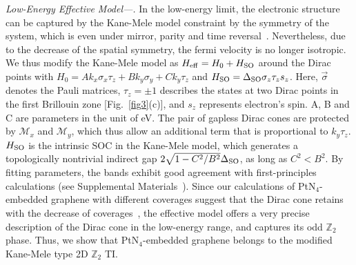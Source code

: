 \documentclass[aps,prl,twocolumn,showpacs,superscriptaddress]{revtex4-1}
\begin{document}
\textit{Low-Energy Effective Model---.} In the low-energy limit, the electronic structure can be captured by the Kane-Mele model constraint by the symmetry of the system, which is even under mirror, parity and time reversal~\cite{ref3,ref4,ref55,ref56}. Nevertheless, due to the decrease of the spatial symmetry, the fermi velocity is no longer isotropic. We thus modify the Kane-Mele
model as $H_{\rm eff}=H_0+H_{\rm SO}$ around the Dirac points with $H_0=Ak_x\sigma_x\tau_z+Bk_y\sigma_y+Ck_y\tau_z$ and $H_{\rm SO}=\Delta_{\rm SO}\sigma_z\tau_zs_z$. Here, $\vec\sigma$ denotes the Pauli matrices, $\tau_z=\pm1$ describes the states at two Dirac points in the first Brillouin zone [Fig.~\ref{fig3}(c)], and $s_z$ represents electron's spin. A, B and C are parameters in the unit of eV. The pair of gapless Dirac cones are protected by $\mathcal{M}_x$ and $\mathcal{M}_y$, which thus allow an additional term that is proportional to $k_y\tau_z$. $H_{\rm SO}$ is the intrinsic SOC in the Kane-Mele model, which generates a topologically nontrivial indirect gap $2\sqrt{1-C^2/B^2} \Delta_{\rm SO}$, as long as $C^2<B^2$. By fitting parameters, the bands exhibit good agreement with first-principles calculations (see Supplemental Materials~\cite {ref52}). Since our calculations of PtN$_4$-embedded graphene with different coverages suggest that the Dirac cone retains with the decrease of coverages~\cite {ref52}, the effective model offers a very precise description of the Dirac cone in the low-energy range, and captures its odd $\mathbb{Z}_2$ phase. Thus, we show that PtN$_4$-embedded graphene belongs to the modified Kane-Mele type 2D $\mathbb{Z}_2$ TI.
\end{document}
